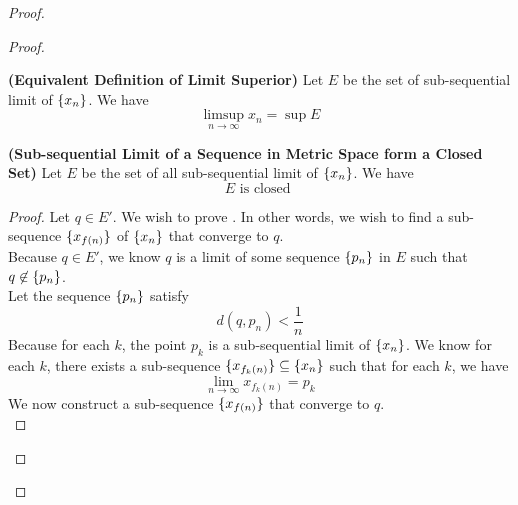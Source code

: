 \documentclass{report}
\begin{document}
\begin{proof}
\begin{proof}
\begin{corollary}
\label{4.3.9}
\textbf{(Equivalent Definition of Limit Superior)} Let $E$ be the set of sub-sequential limit of  $\{ x_n \}$. We have
\begin{equation}
\limsup_{n\to\infty} x_n=\sup E
\end{equation}
\end{corollary}
\begin{theorem}
\label{4.3.10}
\textbf{(Sub-sequential Limit of a Sequence in Metric Space form a Closed Set)} Let $E$ be the set of all sub-sequential limit of $\{ x_n \}$. We have
\begin{equation}
E\text{ is closed }
\end{equation}
\end{theorem}
\begin{proof}
Let $q\in E'$. We wish to prove . In other words, we wish to find a sub-sequence $\{ x_{f(n)} \}$ of $\{ x_n \}$ that converge to $q$.\\

Because $q\in E'$, we know $q$ is a limit of some sequence  $\{ p_n \}$ in $E$ such that $q\not\in \{ p_n \}$.\\

Let the sequence $\{ p_n \}$ satisfy 
\begin{equation}
d(q,p_n)<\frac{1}{n}
\end{equation}
Because for each $k$, the point $p_k$ is a sub-sequential limit of $\{ x_n \}$. We know for each $k$, there exists a sub-sequence $\{ x_{f_k(n)} \}\subseteq \{ x_n \}$ such that for each $k$, we have
\begin{equation}
\lim_{n\to\infty}x_{f_k(n)}= p_k
\end{equation}
We now construct a sub-sequence $\{ x_{f(n)} \}$ that converge to $q$.\\


\end{proof}
\end{proof}
\end{proof}
\end{document}

